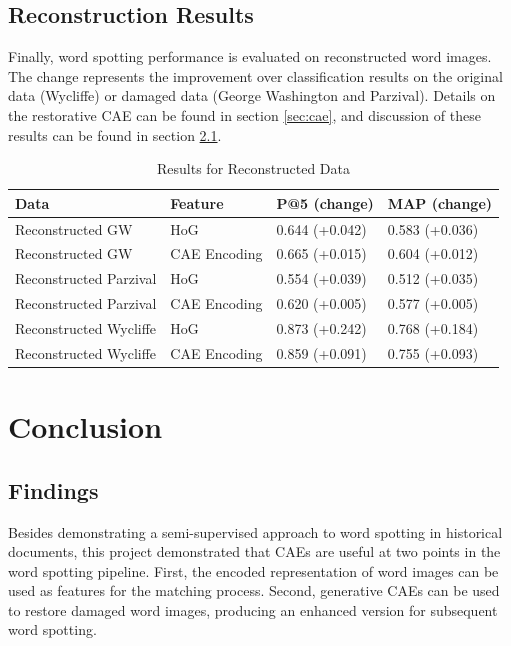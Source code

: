 \documentclass[final]{ukthesis}
\begin{document}
%
%
\section{Reconstruction Results}
\label{sec:reconstruction-results}

Finally, word spotting performance is evaluated on reconstructed word images. The change represents the improvement over classification results on the original data (Wycliffe) or damaged data (George Washington and Parzival). Details on the restorative CAE can be found in section \ref{sec:cae}, and discussion of these results can be found in section \ref{sec:findings}.

\begin{table}[h]
\centering
\begin{tabular}{llll}
\textbf{Data}  & \textbf{Feature} & \textbf{P@5 (change)} & \textbf{MAP (change)} \\
\hline
Reconstructed GW    & HoG			& 0.644 (+0.042)          & 0.583 (+0.036)         \\
Reconstructed GW    & CAE Encoding 	& 0.665 (+0.015)         & 0.604 (+0.012)         \\
Reconstructed Parzival & HoG                     & 0.554 (+0.039)         & 0.512 (+0.035)         \\
Reconstructed Parzival & CAE Encoding 	& 0.620 (+0.005)         & 0.577 (+0.005)         \\
Reconstructed Wycliffe & HoG                     & 0.873 (+0.242)         & 0.768 (+0.184)         \\
Reconstructed Wycliffe & CAE Encoding 	& 0.859 (+0.091)         & 0.755 (+0.093)         \\
\end{tabular}
\caption{Results for Reconstructed Data}
\label{tab:reconstructed-results}
\end{table}





%
%
%
\chapter{Conclusion}

\section{Findings}
\label{sec:findings}
Besides demonstrating a semi-supervised approach to word spotting in historical documents, this project demonstrated that CAEs are useful at two points in the word spotting pipeline. First, the encoded representation of word images can be used as features for the matching process. Second, generative CAEs can be used to restore damaged word images, producing an enhanced version for subsequent word spotting.
\end{document}

